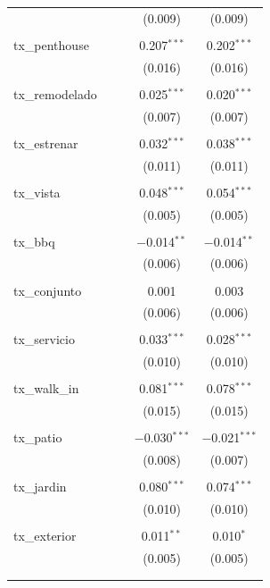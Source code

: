 \begin{table}[!htbp]
\begin{tabular}{@{\extracolsep{5pt}}lcccc}
  &  &  & (0.009) & (0.009) \\ 
  & & & & \\ 
 tx\_penthouse &  &  & 0.207$^{***}$ & 0.202$^{***}$ \\ 
  &  &  & (0.016) & (0.016) \\ 
  & & & & \\ 
 tx\_remodelado &  &  & 0.025$^{***}$ & 0.020$^{***}$ \\ 
  &  &  & (0.007) & (0.007) \\ 
  & & & & \\ 
 tx\_estrenar &  &  & 0.032$^{***}$ & 0.038$^{***}$ \\ 
  &  &  & (0.011) & (0.011) \\ 
  & & & & \\ 
 tx\_vista &  &  & 0.048$^{***}$ & 0.054$^{***}$ \\ 
  &  &  & (0.005) & (0.005) \\ 
  & & & & \\ 
 tx\_bbq &  &  & $-$0.014$^{**}$ & $-$0.014$^{**}$ \\ 
  &  &  & (0.006) & (0.006) \\ 
  & & & & \\ 
 tx\_conjunto &  &  & 0.001 & 0.003 \\ 
  &  &  & (0.006) & (0.006) \\ 
  & & & & \\ 
 tx\_servicio &  &  & 0.033$^{***}$ & 0.028$^{***}$ \\ 
  &  &  & (0.010) & (0.010) \\ 
  & & & & \\ 
 tx\_walk\_in &  &  & 0.081$^{***}$ & 0.078$^{***}$ \\ 
  &  &  & (0.015) & (0.015) \\ 
  & & & & \\ 
 tx\_patio &  &  & $-$0.030$^{***}$ & $-$0.021$^{***}$ \\ 
  &  &  & (0.008) & (0.007) \\ 
  & & & & \\ 
 tx\_jardin &  &  & 0.080$^{***}$ & 0.074$^{***}$ \\ 
  &  &  & (0.010) & (0.010) \\ 
  & & & & \\ 
 tx\_exterior &  &  & 0.011$^{**}$ & 0.010$^{*}$ \\ 
  &  &  & (0.005) & (0.005) \\ 
  & & & & \\ 
\hline \\[-1.8ex] 

\end{tabular}
\end{table}
